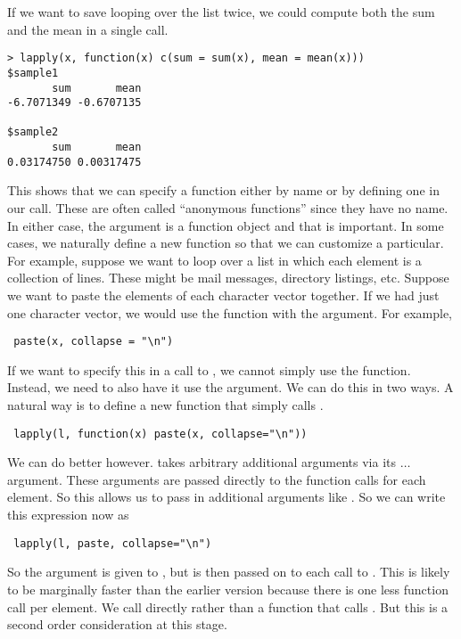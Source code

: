 If we want to save looping over the list twice, we could compute both
the sum and the mean in a single call.
\begin{verbatim}
> lapply(x, function(x) c(sum = sum(x), mean = mean(x)))
$sample1
       sum       mean 
-6.7071349 -0.6707135 

$sample2
       sum       mean 
0.03174750 0.00317475 
\end{verbatim}
This shows that we can specify a function either by name or by
defining one in our call. These are often called ``anonymous functions''
since they have no name.  In either case, the argument is a
function object and that is important. In some cases, we naturally
define a new function so that we can customize a particular. For
example, suppose we want to loop over a list in which each element is
a collection of lines. These might be mail messages, directory
listings, etc. Suppose we want to paste the elements of each
character vector together. If we had just one character vector, we would
use the  function with the 
argument. For example,
\begin{verbatim}
 paste(x, collapse = "\n")
\end{verbatim}
If we want to specify this in a call to , we cannot
simply use the  function. Instead, we need to also
have it use the  argument. We can do this in two
ways. A natural way is to define a new function that simply calls
.
\begin{verbatim}
 lapply(l, function(x) paste(x, collapse="\n"))
\end{verbatim}
We can do better however.  takes arbitrary
additional arguments via its $\ldots$ argument. These arguments are
passed directly to the function calls for each element. So this allows
us to pass in additional arguments like . So we can
write this expression now as
\begin{verbatim}
 lapply(l, paste, collapse="\n")
\end{verbatim}
So the  argument is given to , but is
then passed on to each call to . This is likely to be
marginally faster than the earlier version because there is one less
function call per element. We call  directly rather
than a function that calls . But this is a second
order consideration at this stage.

